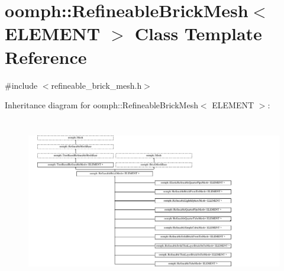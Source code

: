 \hypertarget{classoomph_1_1RefineableBrickMesh}{}\section{oomph\+:\+:Refineable\+Brick\+Mesh$<$ E\+L\+E\+M\+E\+NT $>$ Class Template Reference}
\label{classoomph_1_1RefineableBrickMesh}


{\ttfamily \#include $<$refineable\+\_\+brick\+\_\+mesh.\+h$>$}

Inheritance diagram for oomph\+:\+:Refineable\+Brick\+Mesh$<$ E\+L\+E\+M\+E\+NT $>$\+:\begin{figure}[H]
\begin{center}
\leavevmode
\includegraphics[height=7.291666cm]{classoomph_1_1RefineableBrickMesh}
\end{center}
\end{figure}
